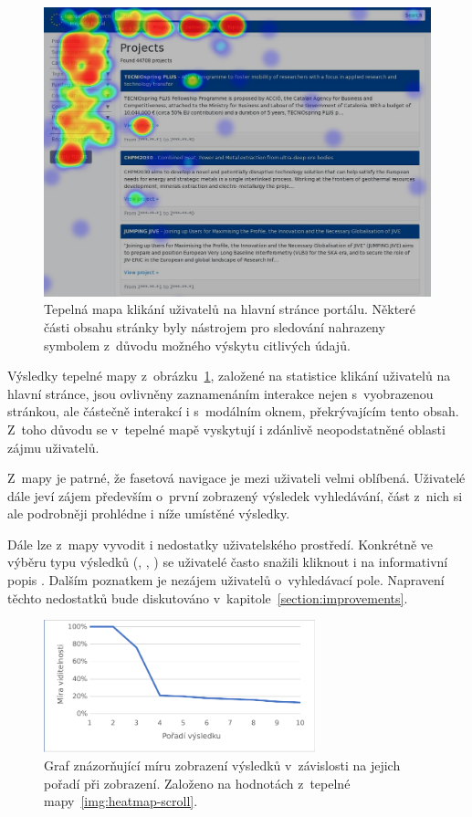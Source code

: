 \begin{figure}[H]
	\centering
	\includegraphics[width=\textwidth]{obrazky-figures/heatmap-click.png}
	\caption{Tepelná mapa klikání uživatelů na hlavní stránce portálu. Některé části obsahu stránky byly nástrojem pro sledování nahrazeny symbolem \uv{*} z~důvodu možného výskytu citlivých údajů.}
	\label{img:heatmap}
\end{figure}

Výsledky tepelné mapy z~obrázku~\ref{img:heatmap}, založené na statistice klikání uživatelů na hlavní stránce, jsou ovlivněny zaznamenáním interakce nejen s~vyobrazenou stránkou, ale částečně interakcí i s~modálním oknem, překrývajícím tento obsah. Z~toho důvodu se v~tepelné mapě vyskytují i zdánlivě neopodstatněné oblasti zájmu uživatelů.

Z~mapy je patrné, že fasetová navigace je mezi uživateli velmi oblíbená. Uživatelé dále jeví zájem především o~první zobrazený výsledek vyhledávání, část z~nich si ale podrobněji prohlédne i níže umístěné výsledky.

Dále lze z~mapy vyvodit i nedostatky uživatelského prostředí. Konkrétně ve výběru typu výsledků (, , ) se uživatelé často snažili kliknout i na informativní popis . Dalším poznatkem je nezájem uživatelů o~vyhledávací pole. Napravení těchto nedostatků bude diskutováno v~kapitole~\ref{section:improvements}.

\begin{figure}[H]
	\centering
	\includegraphics[width=0.7\textwidth]{obrazky-figures/scroll-graph.pdf}
	\caption{Graf znázorňující míru zobrazení výsledků v~závislosti na jejich pořadí při zobrazení. Založeno na hodnotách z~tepelné mapy~\ref{img:heatmap-scroll}.}
	\label{img:scroll-graph}
\end{figure}

